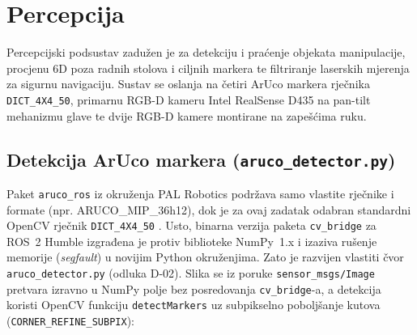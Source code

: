\section{Percepcija}
\label{sec:05-percepcija}

Percepcijski podsustav zadužen je za detekciju i praćenje objekata manipulacije, procjenu 6D poza
radnih stolova i ciljnih markera te filtriranje laserskih mjerenja za sigurnu navigaciju. Sustav se
oslanja na četiri ArUco markera rječnika \texttt{DICT\_4X4\_50}, primarnu RGB-D kameru Intel RealSense
D435 na pan-tilt mehanizmu glave te dvije RGB-D kamere montirane na zapešćima ruku.

\subsection{Detekcija ArUco markera (\texttt{aruco\_detector.py})}
\label{sec:05-aruco}

Paket \texttt{aruco\_ros} iz okruženja PAL Robotics \cite{arucoros} podržava samo vlastite rječnike
i formate (npr. ARUCO\_MIP\_36h12), dok je za ovaj zadatak odabran standardni OpenCV rječnik
\texttt{DICT\_4X4\_50} \cite{mail2026}. Usto, binarna verzija paketa \texttt{cv\_bridge} za ROS~2
Humble izgrađena je protiv biblioteke NumPy~1.x i izaziva rušenje memorije (\emph{segfault}) u novijim
Python okruženjima. Zato je razvijen vlastiti čvor \texttt{aruco\_detector.py} (odluka D-02).
Slika se iz poruke \texttt{sensor\_msgs/Image} pretvara izravno u NumPy polje bez posredovanja
\texttt{cv\_bridge}-a, a detekcija koristi OpenCV funkciju \texttt{detectMarkers} uz subpikselno
poboljšanje kutova (\texttt{CORNER\_REFINE\_SUBPIX}):

